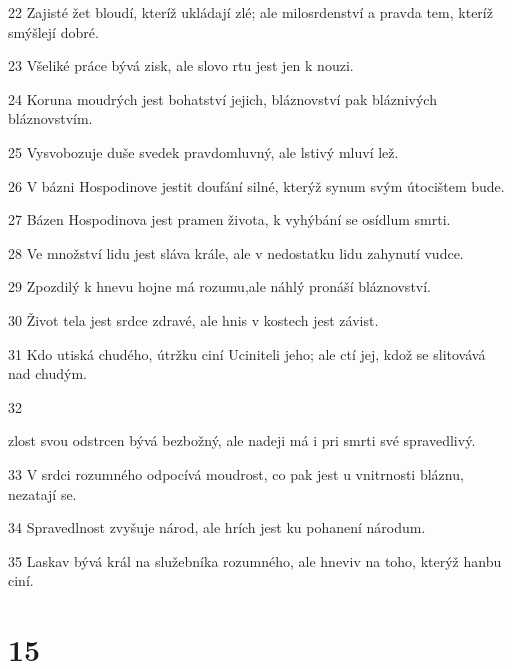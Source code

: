 \par 22 Zajisté žet bloudí, kteríž ukládají zlé; ale milosrdenství a pravda tem, kteríž smýšlejí dobré.
\par 23 Všeliké práce bývá zisk, ale slovo rtu jest jen k nouzi.
\par 24 Koruna moudrých jest bohatství jejich, bláznovství pak bláznivých bláznovstvím.
\par 25 Vysvobozuje duše svedek pravdomluvný, ale lstivý mluví lež.
\par 26 V bázni Hospodinove jestit doufání silné, kterýž synum svým útocištem bude.
\par 27 Bázen Hospodinova jest pramen života, k vyhýbání se osídlum smrti.
\par 28 Ve množství lidu jest sláva krále, ale v nedostatku lidu zahynutí vudce.
\par 29 Zpozdilý k hnevu hojne má rozumu,ale náhlý pronáší bláznovství.
\par 30 Život tela jest srdce zdravé, ale hnis v kostech jest závist.
\par 31 Kdo utiská chudého, útržku ciní Uciniteli jeho; ale ctí jej, kdož se slitovává nad chudým.
\par 32 \par zlost svou odstrcen bývá bezbožný, ale nadeji má i pri smrti své spravedlivý.
\par 33 V srdci rozumného odpocívá moudrost, co pak jest u vnitrnosti bláznu, nezatají se.
\par 34 Spravedlnost zvyšuje národ, ale hrích jest ku pohanení národum.
\par 35 Laskav bývá král na služebníka rozumného, ale hneviv na toho, kterýž hanbu ciní.

\chapter{15}

